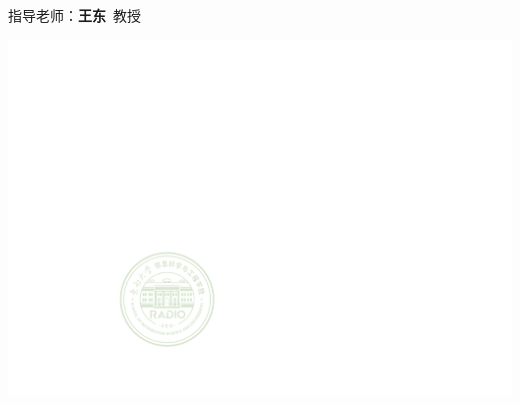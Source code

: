 \documentclass[aspectratio=169,xcolor=table,10pt]{ctexbeamer}
\begin{document}
\begin{frame}
\begin{minipage}[m]{.65\textwidth}
\begin{block}{}
\begin{minipage}[m]{.67\textwidth}
    {指导老师：\textbf{王东}~教授}
    \end{minipage}
    \begin{minipage}[m]{.15\textwidth}
        \includegraphics[width=\textwidth]{RADIOlogo.pdf}
    \end{minipage}
    \end{block} 
    \end{minipage}
    
    
\end{frame}
\end{document}
